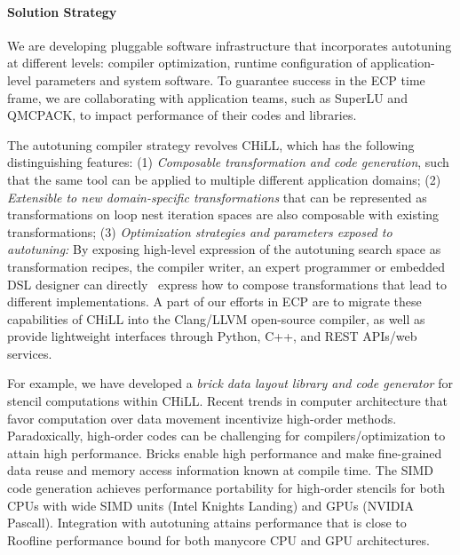 \paragraph{Solution Strategy}
We are developing pluggable software infrastructure that incorporates
autotuning at different levels: compiler optimization, runtime configuration of application-level parameters and system software.
To guarantee success in the ECP time frame, we are collaborating with
application teams, such as SuperLU and QMCPACK, to impact performance of their
codes and libraries.

The autotuning compiler strategy revolves CHiLL, which has the following distinguishing features:
(1) \textit{Composable transformation and code generation}, such
that the same tool can be applied
to multiple different application domains;
(2) \textit{Extensible to new domain-specific transformations} that can be represented as transformations on loop nest iteration spaces are also
composable with existing transformations;
(3) \textit{Optimization strategies and parameters exposed to autotuning:}
By exposing high-level expression
of the autotuning search space as transformation recipes, the compiler writer, an expert programmer or embedded DSL designer can directly \
express how to compose
 transformations that lead to different implementations.
A part of our efforts in ECP are to migrate these capabilities of CHiLL
into the Clang/LLVM open-source compiler, as well as provide lightweight
interfaces through Python, C++, and REST APIs/web services.

For example, we have developed a \textit{brick data layout library and code generator} for
stencil computations within CHiLL.
Recent trends in computer architecture that favor computation over data movement incentivize high-order methods.  Paradoxically, high-order codes can be challenging for compilers/optimization to attain high performance.  Bricks enable high performance and make fine-grained data reuse and memory access information known at compile time.  The SIMD code generation achieves performance portability
for high-order stencils for both CPUs with wide SIMD units (Intel Knights
Landing) and GPUs (NVIDIA Pascall).  Integration with autotuning attains
performance that is close to Roofline performance bound for both manycore CPU
and GPU architectures.

